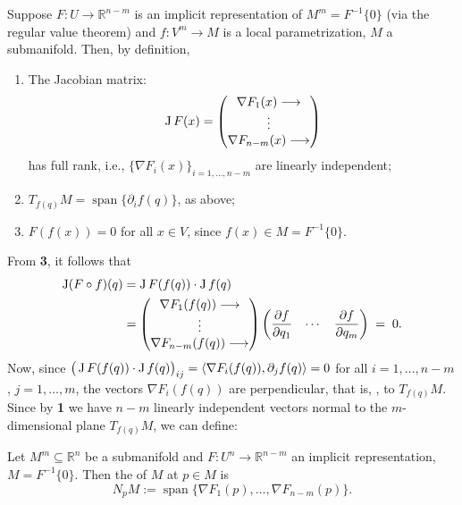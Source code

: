 Suppose $F : U \to \mathbb{R}^{n-m}$ is an implicit representation of $M^m = F^{-1}\{0\}$ (via the
regular value theorem) and $f : V^m \to M$ is a local parametrization, $M$ a submanifold. Then, by
definition,
\begin{enumerate}[label=\textbf{(\alph*)}]
  \item The Jacobian matrix:
\[ \operatorname{J} F(x) = \begin{pmatrix} \nabla F_1(x) \longrightarrow \\ \vdots \\ \nabla F_{n-m}(x) \longrightarrow \end{pmatrix} \]
    has full rank, i.e., $\{\nabla F_i(x)\}_{i=1,\dots,n-m}$ are linearly independent;
  \item $T_{f(q)}M = \operatorname{span}\{\partial_if(q)\}$, as above;
  \item $F(f(x)) = 0$ for all $x \in V$, since $f(x) \in M = F^{-1}\{0\}$.
\end{enumerate}
From \textbf{3}, it follows that
\begin{align*}
\operatorname{J}(F\circ f)(q)
  &= \operatorname{J} F(f(q))\cdot\operatorname{J} f(q) \\
  &= \begin{pmatrix} \nabla F_1(f(q)) \longrightarrow \\ \vdots \\ \nabla F_{n-m}(f(q)) \longrightarrow \end{pmatrix}
     \begin{pmatrix} \dfrac{\partial f}{\partial q_1} & \cdots & \dfrac{\partial f}{\partial q_m}\end{pmatrix}
   \;=\; 0.
\end{align*}
Now, since $\big(\operatorname{J} F(f(q))\cdot\operatorname{J} f(q)\big)_{ij} = \langle \nabla F_i(f(q)), \partial_jf(q)\rangle = 0$
for all $i=1,\dots,n-m$, $j=1,\dots,m$, the vectors $\nabla F_i(f(q))$ are perpendicular, that is,
, to $T_{f(q)}M$. Since by \textbf{1} we have $n-m$ linearly independent vectors
normal to the $m$-dimensional plane $T_{f(q)}M$, we can define:

\begin{definition}
\label{def:normal_space}
Let $M^m \subseteq \mathbb{R}^n$ be a submanifold and $F : U^n \to \mathbb{R}^{n-m}$ an implicit
representation, $M = F^{-1}\{0\}$. Then the   of
$M$ at $p \in M$ is
\[N_pM := \operatorname{span}\{\nabla F_1(p),\dots,\nabla F_{n-m}(p)\}.\]
\end{definition}

